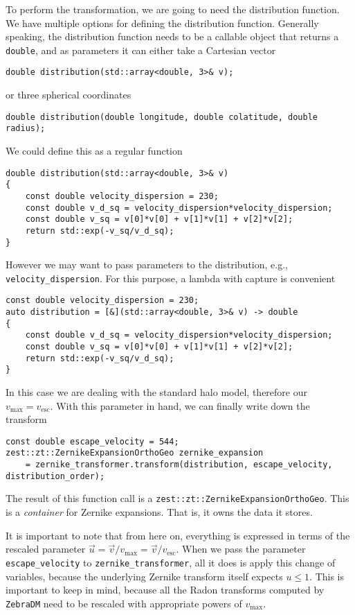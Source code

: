 \documentclass{article}
\begin{document}
To perform the transformation, we are going to need the distribution function. We have multiple options for defining the distribution function. Generally speaking, the distribution function needs to be a callable object that returns a \texttt{double}, and as parameters it can either take a Cartesian vector
\begin{verbatim}
double distribution(std::array<double, 3>& v);
\end{verbatim}
or three spherical coordinates
\begin{verbatim}
double distribution(double longitude, double colatitude, double radius);
\end{verbatim}
We could define this as a regular function
\begin{verbatim}
double distribution(std::array<double, 3>& v)
{
    const double velocity_dispersion = 230;
    const double v_d_sq = velocity_dispersion*velocity_dispersion;
    const double v_sq = v[0]*v[0] + v[1]*v[1] + v[2]*v[2];
    return std::exp(-v_sq/v_d_sq);
}
\end{verbatim}
However we may want to pass parameters to the distribution, e.g., \texttt{velocity_dispersion}. For this purpose, a lambda with capture is convenient
\begin{verbatim}
const double velocity_dispersion = 230;
auto distribution = [&](std::array<double, 3>& v) -> double
{
    const double v_d_sq = velocity_dispersion*velocity_dispersion;
    const double v_sq = v[0]*v[0] + v[1]*v[1] + v[2]*v[2];
    return std::exp(-v_sq/v_d_sq);
}
\end{verbatim}

In this case we are dealing with the standard halo model, therefore our $v_\text{max}=v_\text{esc}$. With this parameter in hand, we can finally write down the transform
\begin{verbatim}
const double escape_velocity = 544;
zest::zt::ZernikeExpansionOrthoGeo zernike_expansion
    = zernike_transformer.transform(distribution, escape_velocity, distribution_order);
\end{verbatim}
The result of this function call is a \texttt{zest::zt::ZernikeExpansionOrthoGeo}. This is a \emph{container} for Zernike expansions. That is, it owns the data it stores.

It is important to note that from here on, everything is expressed in terms of the rescaled parameter $\vec{u}=\vec{v}/v_\text{max}=\vec{v}/v_\text{esc}$. When we pass the parameter \texttt{escape_velocity} to \texttt{zernike_transformer}, all it does is apply this change of variables, because the underlying Zernike transform itself expects $u\leq1$. This is important to keep in mind, because all the Radon transforms computed by \texttt{ZebraDM} need to be rescaled with appropriate powers of $v_\text{max}$.
\end{document}
